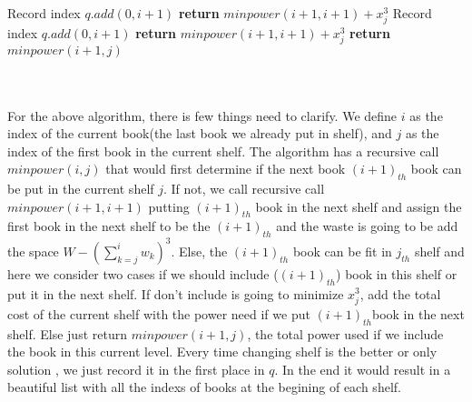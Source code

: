 \documentclass[14pt]{article}
\begin{document}
\begin{enumerate}
\begin{minipage}{\linewidth}
\begin{algorithm}[H]
\begin{algorithmic}[1]
                \Else
                  \State Record index $q.add(0, i+1)$
                  \State \textbf{return} $minpower(i+1, i+1) + x_{j}^3$
                  \State Record index $q.add(0,i+1)$  
                  \State \textbf{return} $minpower(i+1, i+1) + x_{j}^3$
                \Else
                  \State \textbf{return $minpower(i+1, j)$}
                \EndIf
            \EndIf
            \EndProcedure
          \end{algorithmic}
        \end{algorithm}
        \end{minipage}\\\\
    For the above algorithm, there is few things need to clarify. We define $i$ 
    as the index of the current book(the last book we already put in shelf), and
    $j$ as the index of the first book in the current shelf. The algorithm has 
    a recursive call $minpower(i,j)$ that would first determine if the next book
    $(i+1)_{th}$ book can be put in the current shelf $j$. If not, we call recursive
    call $minpower(i+1,i+1)$ putting $(i+1)_{th}$ book in the next shelf and assign
    the first book in the next shelf to be the $(i+1)_{th}$ and the waste is going to
    be add the space $W-(\sum_{k = j}^i w_k)^3$. Else, the $(i+1)_{th}$
    book can be fit in $j_{th}$ shelf and here we consider two cases if we should
    include ($(i+1)_{th}$) book in this shelf or put it in the next shelf. If don't
    include is going to minimize $x_j^3$, add the total cost of the current shelf
    with the power need if we put $(i+1)_{th}$book in the next shelf. Else
    just return $minpower(i+1,j)$, the total power used if we include the book in 
    this current level. Every time changing shelf is the better or only solution
    , we just record it in the first place in $q$. In the end it would result in 
    a beautiful list with all the indexs of books at the begining of each shelf.


\end{enumerate}
\end{document}
